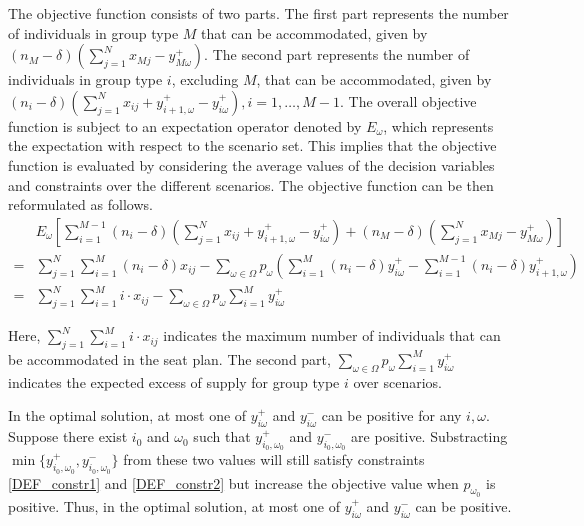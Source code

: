 The objective function consists of two parts. The first part represents the number of individuals in
group type $M$ that can be accommodated, given by $(n_{M}-\delta) (\sum_{j=1}^{N} x_{Mj} - y_{M\omega}^{+})$. The second part represents the number of individuals in group type $i$, excluding $M$, that can be accommodated, given by $(n_i-\delta) (\sum_{j=1}^{N} x_{ij} + y_{i+1,\omega}^{+} - y_{i\omega}^{+}), i = 1, \ldots, M-1$. The overall objective function is subject to an expectation operator denoted by $E_{\omega}$, which represents the expectation with respect to the scenario set. This implies that the objective function is evaluated by considering the average values of the decision variables and constraints over the different scenarios. The objective function can be then reformulated as follows.
\begin{align*}
  & E_{\omega}\left[\sum_{i=1}^{M-1} (n_i-\delta) (\sum_{j= 1}^{N} x_{ij} + y_{i+1,\omega}^{+} - y_{i \omega}^{+}) + (n_M-\delta) (\sum_{j= 1}^{N} x_{Mj} - y_{M \omega}^{+})\right] \\
  = & \sum_{j =1}^{N} \sum_{i=1}^M (n_i- \delta) x_{ij} - \sum_{\omega \in \Omega} p_{\omega} \left(\sum_{i=1}^{M}(n_i- \delta)y_{i \omega}^{+} - \sum_{i=1}^{M-1}(n_i-\delta)y_{i+1, \omega}^{+}\right) \\
  = & \sum_{j =1}^{N} \sum_{i=1}^M i \cdot x_{ij} - \sum_{\omega \in \Omega} p_{\omega} \sum_{i = 1}^{M} y_{i \omega}^{+}
\end{align*}

Here, $\sum_{j =1}^{N} \sum_{i=1}^M i \cdot x_{ij}$ indicates the maximum number of individuals that can be accommodated in the seat plan. The second part, $\sum_{\omega \in \Omega} p_{\omega} \sum_{i = 1}^{M} y_{i \omega}^{+}$ indicates the expected excess of supply for group type $i$ over scenarios.

In the optimal solution, at most one of $y_{i \omega}^{+}$ and $y_{i \omega}^{-}$ can be positive for any $i, \omega$. Suppose there exist $i_0$ and $\omega_0$ such that $y_{i_0, \omega_0}^{+}$ and $y_{i_0, \omega_0}^{-}$ are positive. Substracting $\min\{y_{i_0, \omega_0}^{+}, y_{i_0, \omega_0}^{-}\}$ from these two values will still satisfy constraints \eqref{DEF_constr1} and \eqref{DEF_constr2} but increase the objective value when $p_{\omega_0}$ is positive. Thus, in the optimal solution, at most one of $y_{i \omega}^{+}$ and $y_{i \omega}^{-}$ can be positive.


